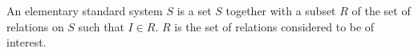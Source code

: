 An elementary standard system $S$ is a set $S$ together with a subset $R$ of the set of relations on $S$ such that $I \in R$. $R$ is the set of relations considered to be of interest.

